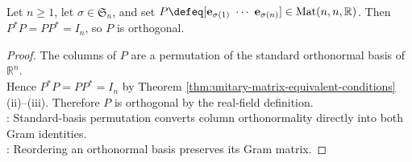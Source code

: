 \begin{proposition} \label{prop:permutation-matrices-are-orthogonal} \\
Let $n\geq1$, let $\sigma\in\mathfrak{S}_n$, and set $P\defeq[\mathbf{e}_{\sigma(1)}\ \cdots\ \mathbf{e}_{\sigma(n)}]\in\operatorname{Mat}(n,n,\mathbb{R})$. Then $P^*P=PP^*=I_n$, so $P$ is orthogonal.
\begin{proof}
The columns of $P$ are a permutation of the standard orthonormal basis of $\mathbb{R}^n$.\\
Hence $P^*P=PP^*=I_n$ by Theorem \ref{thm:unitary-matrix-equivalent-conditions}(ii)--(iii). Therefore $P$ is orthogonal by the real-field definition.\\
: Standard-basis permutation converts column orthonormality directly into both Gram identities.\\
: Reordering an orthonormal basis preserves its Gram matrix.
\end{proof}
\end{proposition}

